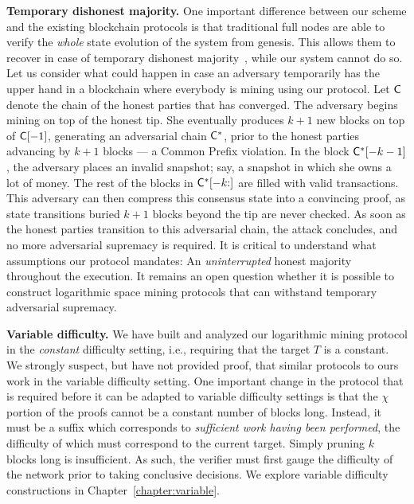 \noindent
\textbf{Temporary dishonest majority.} One important difference between our scheme
and the existing blockchain protocols is that traditional full nodes are able to verify the \emph{whole}
state evolution of the system from genesis. This allows them to recover in case of
temporary dishonest majority~\cite{dishonest-majority,supremacy}, while our system cannot
do so. Let us consider what could happen in case an adversary temporarily
has the upper hand in a blockchain where everybody is mining using our protocol. Let
$\mathsf{C}$ denote the chain of the honest parties that has converged. The adversary
begins mining on top of the honest tip. She eventually produces $k+1$ new blocks on
top of $\mathsf{C}[-1]$, generating an adversarial chain $\mathsf{C}^*$, prior to the honest
parties advancing by $k+1$ blocks --- a Common Prefix violation. In the block $\mathsf{C}^*[-k - 1]$,
the adversary places an invalid snapshot; say, a snapshot in which she owns a lot of
money. The rest of the blocks in $\mathsf{C}^*[-k{:}]$ are filled with valid transactions.
This adversary can then compress this consensus state into a convincing proof,
as state transitions buried $k + 1$ blocks beyond the tip are never checked.
As soon as the honest parties transition to this adversarial chain, the attack
concludes, and no more adversarial supremacy is required. It is critical to understand
what assumptions our protocol mandates: An \emph{uninterrupted} honest majority throughout the
execution. It remains an open question whether it is possible to construct
logarithmic space mining protocols that can withstand temporary adversarial
supremacy.

\noindent
\textbf{Variable difficulty.} We have built and analyzed our logarithmic mining protocol in the
\emph{constant} difficulty setting, i.e., requiring that the target $T$ is a constant.
We strongly suspect, but have not provided proof, that similar protocols to ours work in the
variable difficulty setting. One important change in the protocol that is required
before it can be adapted to variable difficulty settings is that the $\chi$ portion
of the proofs cannot be a constant number of blocks long. Instead, it must be a
suffix which corresponds to \emph{sufficient work having been performed}, the
difficulty of which must correspond to the current target. Simply pruning $k$ blocks
long is insufficient. As such, the verifier
must first gauge the difficulty of the network prior to taking conclusive decisions.
We explore variable difficulty constructions in Chapter~\ref{chapter:variable}.


